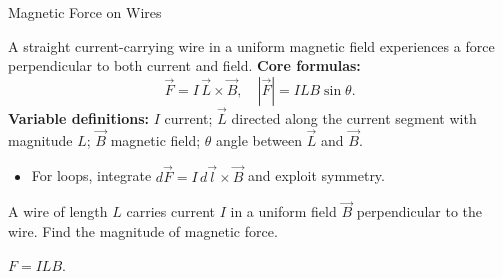 \begin{KnowledgePoint}{Magnetic Force on Wires \Core}
  \KPFormulas
  \begin{formulabox}
  A straight current-carrying wire in a uniform magnetic field experiences a force perpendicular to both current and field.
  \textbf{Core formulas:}
  \[
    \vec F=I\,\vec L\times\vec B,\quad |\vec F|=ILB\sin\theta.
  \]
  \textbf{Variable definitions:} $I$ current; $\vec L$ directed along the current segment with magnitude $L$; $\vec B$ magnetic field; $\theta$ angle between $\vec L$ and $\vec B$.
  \end{formulabox}

  \KPHeuristics
  \begin{heuristicsbox}
  \begin{itemize}[leftmargin=*]
    \item For loops, integrate $d\vec F=I\,d\vec l\times\vec B$ and exploit symmetry.
  \end{itemize}
  \end{heuristicsbox}

  \KPProblems
  \begin{cheatproblem}
  A wire of length $L$ carries current $I$ in a uniform field $\vec B$ perpendicular to the wire. Find the magnitude of magnetic force.
  \begin{solutionbox}
  $F=ILB$.
  \end{solutionbox}
  \end{cheatproblem}
\end{KnowledgePoint}

